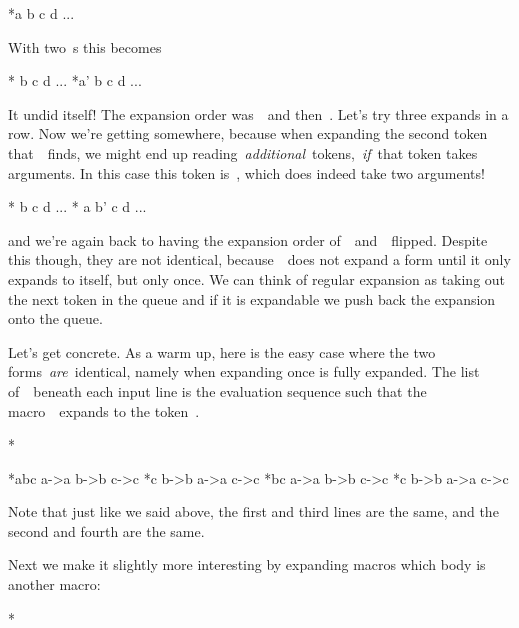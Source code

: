 {{\starttyping
*\expandafter a  b  c  d ...
\stoptyping

With two~\type{\expandafter}s this becomes

\starttyping
*\expandafter {}  b  c  d ...
*\expandafter  a' b  c  d ...
\stoptyping

It undid itself! The expansion order was~~and then~.
Let's try three expands in a row. Now we're getting somewhere, because
when expanding the second token that~\type{\expandafter}~finds, we might
end up reading~{\em additional}~tokens,~{\em if}~that token takes
arguments. In this case this token is~\type{\expandafter}, which does
indeed take two arguments!

\starttyping
*\expandafter \expandafter {}  b  c  d ...
*             \expandafter       a  b'        c  d ...
\stoptyping

and we're again back to having the expansion order
of~~and~~flipped. Despite this though, they are not
identical, because~~does not expand a form until it
only expands to itself, but only once. We can think of regular expansion
as taking out the next token in the queue and if it is expandable we
push back the expansion onto the queue.

Let's get concrete. As a warm up, here is the easy case where the two
forms~{\em are}~identical, namely when expanding once is fully expanded.
The list of~~beneath each input line is the evaluation
sequence such that the macro~\type{\A}~expands to the token~.

\starttyping
*\def\A{a}\def\B{b}\def\C{c}

*\A\B\C
\A ->a   \B ->b   \C ->c
*\expandafter\A\B\C
\B ->b   \A ->a   \C ->c
*\expandafter\expandafter\A\B\C
\A ->a   \B ->b   \C ->c
*\expandafter\expandafter\expandafter\A\B\C
\B ->b   \A ->a   \C ->c
\stoptyping

Note that just like we said above, the first and third lines are the
same, and the second and fourth are the same.

Next we make it slightly more interesting by expanding macros which body
is another macro:

\starttyping
*\def\AA{\A}\def\BB{\B}\def\CC{\C}

}}
